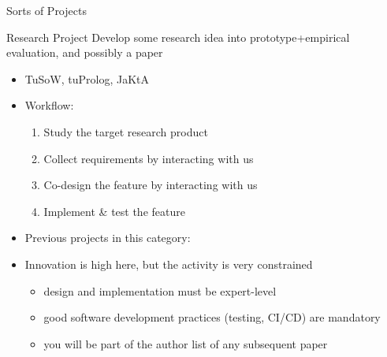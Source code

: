 \documentclass[presentation]{beamer}\mode<presentation>{\usetheme{AMSBolognaFC}}
\begin{document}
\begin{frame}[c, allowframebreaks]{Sorts of Projects}
    \begin{block}{Research \courseAcronym{} Project}
        Develop some research idea into prototype+empirical evaluation, 
		and possibly a paper
        \begin{itemize}
            \item[eg] TuSoW, tuProlog, JaKtA
            \item Workflow:
            \begin{enumerate}
                \item Study the target research product
                \item Collect requirements by interacting with us
                \item Co-design the feature by interacting with us
                \item Implement \& test the feature
            \end{enumerate}
            \item Previous projects in this category: 
            \item[!] Innovation is high here, but the activity is very constrained
            \begin{itemize}
                \item design and implementation must be expert-level
                \item good software development practices (testing, CI/CD) are mandatory
                \item you will be part of the author list of any subsequent paper
            \end{itemize}
        \end{itemize}
    \end{block}


\end{frame}
\end{document}
